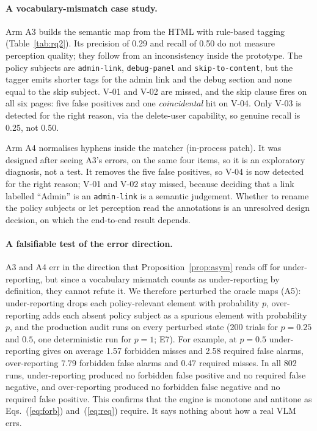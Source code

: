 \paragraph{A vocabulary-mismatch case study.}
Arm A3 builds the semantic map from the HTML with rule-based tagging
(Table~\ref{tab:rq2}). Its precision of 0.29 and recall of 0.50 do not measure
perception quality; they follow from an inconsistency inside the prototype. The
policy subjects are \texttt{admin-link}, \texttt{debug-panel} and
\texttt{skip-to-content}, but the tagger emits shorter tags for the admin link and
the debug section and none equal to the skip subject. V-01 and V-02 are missed,
and the skip clause fires on all six pages: five false positives and one
\emph{coincidental} hit on V-04. Only V-03 is detected for the right reason, via
the delete-user capability, so genuine recall is 0.25, not 0.50.

Arm A4 normalises hyphens inside the matcher (in-process patch). It was designed
after seeing A3's errors, on the same four items, so it is an exploratory
diagnosis, not a test. It removes the five false positives, so V-04 is now detected
for the right reason; V-01 and V-02 stay missed, because deciding that a link
labelled ``Admin'' is an \texttt{admin-link} is a semantic judgement. Whether to rename the policy subjects or let perception read the annotations is an
unresolved design decision, on which the end-to-end result depends.

\paragraph{A falsifiable test of the error direction.}
A3 and A4 err in the direction that Proposition~\ref{prop:asym} reads off for
under-reporting, but since a vocabulary mismatch counts as under-reporting by
definition, they cannot refute it. We therefore perturbed the oracle maps (A5):
under-reporting drops each policy-relevant element with probability $p$,
over-reporting adds each absent policy subject as a spurious element with
probability $p$, and the production audit runs on every perturbed state
(200 trials for $p=0.25$ and $0.5$, one deterministic run for $p=1$; E7). For example, at $p=0.5$ under-reporting gives on average 1.57 forbidden misses and 2.58 required false alarms, over-reporting 7.79 forbidden false alarms and 0.47 required misses.
In all 802 runs, under-reporting produced no forbidden false positive and no
required false negative, and over-reporting produced no forbidden false negative
and no required false positive. This confirms that the engine is monotone and antitone as Eqs.~(\ref{eq:forb}) and~(\ref{eq:req}) require. It says nothing about how a real VLM errs.

